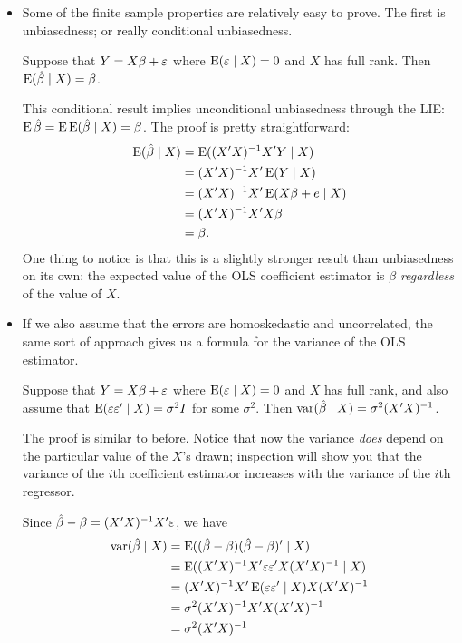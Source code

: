 \begin{itemize}
\item Some of the finite sample properties are relatively easy to
  prove.  The first is unbiasedness; or really conditional
  unbiasedness.
  \begin{thm}
    Suppose that $Y = X\beta + \varepsilon$ where $\operatorname{E}(\varepsilon \mid X) = 0$ and $X$ has
    full rank.  Then $\operatorname{E}(\hat{\beta} \mid X) = \beta$.
  \end{thm}
  This conditional result implies unconditional unbiasedness through
  the LIE: $\operatorname{E} \hat{\beta} = \operatorname{E} \operatorname{E}(\hat{\beta} \mid X) = \beta$.  The proof is pretty
  straightforward:
  \begin{align*}
    \operatorname{E}(\hat{\beta} \mid X) &= \operatorname{E}((X'X)^{-1} X'Y \mid X) \\
    &= (X'X)^{-1} X'\operatorname{E}(Y \mid X) \\
    &= (X'X)^{-1} X'\operatorname{E}(X\beta + e \mid X) \\
    &= (X'X)^{-1} X'X \beta \\
    &= \beta.
  \end{align*}
  One thing to notice is that this is a slightly stronger result than
  unbiasedness on its own: the expected value of the OLS coefficient
  estimator is $\beta$ \emph{regardless} of the value of $X$.

\item If we also assume that the errors are homoskedastic and
  uncorrelated, the same sort of approach gives us a formula for the
  variance of the OLS estimator.
  \begin{thm}
    Suppose that $Y = X\beta + \varepsilon$ where $\operatorname{E}(\varepsilon \mid X) = 0$ and $X$ has
    full rank, and also assume that $\operatorname{E}(\varepsilon \varepsilon' \mid X) = \sigma^2 I$ for some
    $\sigma^2$.  Then $\operatorname{var}(\hat{\beta} \mid X) = \sigma^2(X'X)^{-1}$.
  \end{thm}

  The proof is similar to before.  Notice that now the variance
  \emph{does} depend on the particular value of the $X$'s drawn;
  inspection will show you that the variance of the $i$th coefficient
  estimator increases with the variance of the $i$th regressor.

  Since $\hat{\beta} - \beta = (X'X)^{-1}X'\varepsilon$, we have
  \begin{align*}
    \operatorname{var}(\hat{\beta} \mid X) &= \operatorname{E}((\hat{\beta} - \beta)(\hat{\beta}-\beta)' \mid X) \\
    &= \operatorname{E}((X'X)^{-1}X'\varepsilon\varepsilon'X(X'X)^{-1} \mid X) \\
    &= (X'X)^{-1} X' \operatorname{E}(\varepsilon\varepsilon' \mid X) X (X'X)^{-1} \\
    &= \sigma^2 (X'X)^{-1} X'X (X'X)^{-1} \\
    &= \sigma^2 (X'X)^{-1}
  \end{align*}


\end{itemize}
